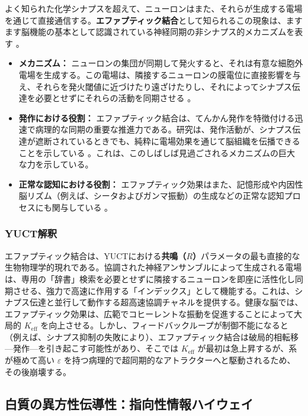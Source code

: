 \documentclass[12pt,a4paper]{article}
\begin{document}
	よく知られた化学シナプスを超えて、ニューロンはまた、それらが生成する電場を通じて直接通信する。\textbf{エファプティック結合}として知られるこの現象は、ますます脳機能の基本として認識されている神経同期の非シナプス的メカニズムを表す \cite{Jefferys1995, Anastassiou2011}。
	
	\begin{itemize}
		\item \textbf{メカニズム：} ニューロンの集団が同期して発火すると、それは有意な細胞外電場を生成する。この電場は、隣接するニューロンの膜電位に直接影響を与え、それらを発火閾値に近づけたり遠ざけたりし、それによってシナプス伝達を必要とせずにそれらの活動を同期させる \cite{Frohlich2010}。
		\item \textbf{発作における役割：} エファプティック結合は、てんかん発作を特徴付ける迅速で病理的な同期の重要な推進力である。研究は、発作活動が、シナプス伝達が遮断されているときでも、純粋に電場効果を通じて脳組織を伝播できることを示している \cite{Zhang2022, Dudek1998}。これは、このしばしば見過ごされるメカニズムの巨大な力を示している。
		\item \textbf{正常な認知における役割：} エファプティック効果はまた、記憶形成や内因性脳リズム（例えば、シータおよびガンマ振動）の生成などの正常な認知プロセスにも関与している \cite{Anastassiou2011}。
	\end{itemize}
	
	\subsubsection*{YUCT解釈}
	エファプティック結合は、YUCTにおける\textbf{共鳴（\(R\)）}パラメータの最も直接的な生物物理学的現れである。協調された神経アンサンブルによって生成される電場は、専用の「辞書」検索を必要とせずに隣接するニューロンを即座に活性化し同期させる、強力で高速に作用する「インデックス」として機能する。これは、シナプス伝達と並行して動作する超高速協調チャネルを提供する。健康な脳では、エファプティック効果は、広範でコヒーレントな振動を促進することによって大局的 \(K_{\mathrm{eff}}\) を向上させる。しかし、フィードバックループが制御不能になると（例えば、シナプス抑制の失敗により）、エファプティック結合は破局的相転移—発作—を引き起こす可能性があり、そこでは \(K_{\mathrm{eff}}\) が最初は急上昇するが、系が極めて高い \(\varepsilon\) を持つ病理的で超同期的なアトラクターへと駆動されるため、その後崩壊する。
	
	\subsection{白質の異方性伝導性：指向性情報ハイウェイ}
	
\end{document}
